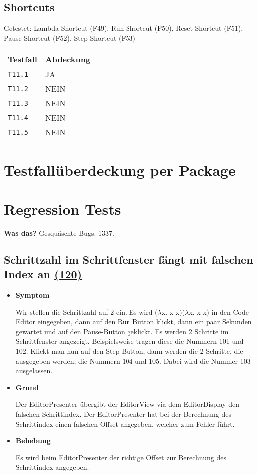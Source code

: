 \documentclass[parskip=full,11pt,twoside]{scrartcl}
\newcommand{\issueref}[1]{
    \href{https://git.scc.kit.edu/ap/Aurora/issues/#1}{(#1)}
}
\newcommand{\regrtest}[5]{
    \subsection{#1 \issueref{#2}}
    \begin{itemize}
        \item \textbf{Symptom}
            #3
        \item \textbf{Grund}
            #4
        \item \textbf{Behebung}
            #5
    \end{itemize}
}
\begin{document}
\subsection{Shortcuts}
    Getestet:
    Lambda-Shortcut (F49),
    Run-Shortcut (F50),
    Reset-Shortcut (F51),
    Pause-Shortcut (F52),
    Step-Shortcut (F53)
    
    \label{shortcuts}
    \begin{center}
        \begin{tabular}{ p{9cm} p{4cm}}
            Testfall & Abdeckung \\ \hline
            \texttt{T11.1} & \cellcolor{green!20}JA \\ \hline
            \texttt{T11.2} & \cellcolor{red!20}NEIN \\ \hline
            \texttt{T11.3} & \cellcolor{red!20}NEIN \\ \hline
            \texttt{T11.4} & \cellcolor{red!20}NEIN \\ \hline
            \texttt{T11.5} & \cellcolor{red!20}NEIN \\ \hline
        \end{tabular}
    \end{center}
    
\section{Testfallüberdeckung per Package}

\section{Regression Tests}
    \textbf{Was das?}
    Gesquäschte Bugs: 1337.
    
    
    \regrtest{Schrittzahl im Schrittfenster fängt mit falschen Index an}{120}{
        Wir stellen die Schrittzahl auf 2 ein.
        Es wird ($\lambda$x. x x)($\lambda$x. x x) in den Code-Editor eingegeben,  
            dann auf den Run Button klickt, dann ein paar Sekunden gewartet und auf den Pause-Button geklickt.
        Es werden 2 Schritte im Schrittfenster angezeigt.
        Beispielsweise tragen diese die Nummern 101 und 102.
        Klickt man nun auf den Step Button, dann werden die 2 Schritte, die ausgegeben werden, die Nummern 104 und 105.
        Dabei wird die Nummer 103 ausgelassen.
    }{
        Der EditorPresenter übergibt der EditorView via dem EditorDisplay den falschen Schrittindex. 
        Der EditorPresenter hat bei der Berechnung des Schrittindex einen falschen Offset angegeben, welcher zum Fehler führt.
    }{
        Es wird beim EditorPresenter der richtige Offset zur Berechnung des Schrittindex angegeben. 
    }
    
\end{document}
